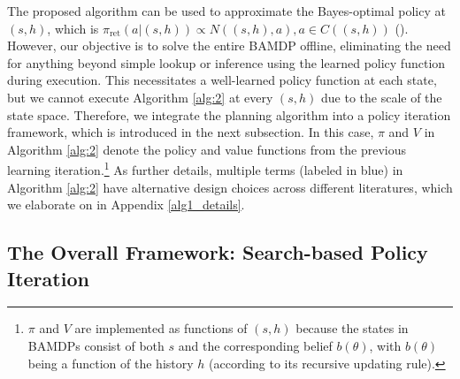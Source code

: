 
The proposed algorithm can be used to approximate the Bayes-optimal policy at $(s, h)$, which is $\pi_{\text{ret}}(a|(s, h)) \propto N((s, h), a), a \in C((s, h))$ (\cite{DBLP:conf/pkdd/AugerCT13}). However, our objective is to solve the entire BAMDP offline, eliminating the need for anything beyond simple lookup or inference using the learned policy function during execution. This necessitates a well-learned policy function at each state, but we cannot execute Algorithm \ref{alg:2} at every $(s, h)$ due to the scale of the state space. Therefore, we integrate the planning algorithm into a policy iteration framework, which is introduced in the next subsection. In this case, $\pi$ and $V$ in Algorithm \ref{alg:2} denote the policy and value functions from the previous learning iteration.\footnote{\(\pi\) and \(V\) are implemented as functions of \((s, h)\) because the states in BAMDPs consist of both \(s\) and the corresponding belief \(b(\theta)\), with \(b(\theta)\) being a function of the history \(h\) (according to its recursive updating rule).} As further details, multiple terms (labeled in blue) in Algorithm \ref{alg:2} have alternative design choices across different literatures, which we elaborate on in Appendix \ref{alg1_details}.




\subsection{The Overall Framework: Search-based Policy Iteration} \label{SBPI}


